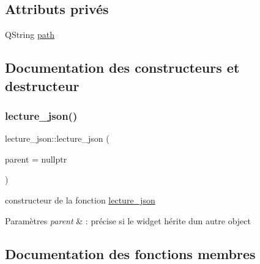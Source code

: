 \subsection*{Attributs privés}
\begin{DoxyCompactItemize}
\item 
Q\+String \hyperlink{classlecture__json_addfbc41d56e266180e4a120ba3cd1c61}{path}
\end{DoxyCompactItemize}


\subsection{Documentation des constructeurs et destructeur}
\mbox{\label{classlecture__json_a4b8226b61ad6f1112038dde13e207b4f}} 
\subsubsection{\texorpdfstring{lecture\+\_\+json()}{lecture\_json()}}
{\footnotesize\ttfamily lecture\+\_\+json\+::lecture\+\_\+json (\begin{DoxyParamCaption}\item[{Q\+Object $\ast$}]{parent = {\ttfamily nullptr} }\end{DoxyParamCaption})\hspace{0.3cm}{\ttfamily [explicit]}}



constructeur de la fonction \hyperlink{classlecture__json}{lecture\+\_\+json} 


\begin{DoxyParams}{Paramètres}
{\em parent} & \+: précise si le widget hérite d\textquotesingle{}un autre object \\
\hline
\end{DoxyParams}


\subsection{Documentation des fonctions membres}
\mbox{\label{classlecture__json_a62f7f4bea2c9579c37bea5b14177a5db}} 
